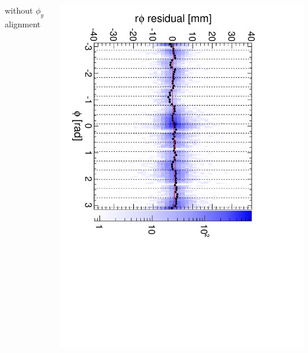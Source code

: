 \documentclass[compress]{beamer}
\begin{document}
\begin{frame}
\begin{columns}
\centering without $\phi_y$ alignment

\includegraphics[height=\linewidth, angle=90]{diskiter02_phiyzero_p3to4.pdf}
\end{columns}
\end{frame}
\end{document}

